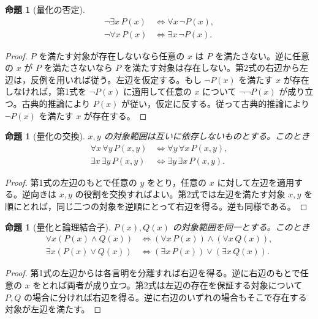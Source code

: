\documentclass[a5paper,10pt,dvipdfmx]{jsarticle}
\theoremstyle{definition}
\theoremstyle{plain}
\newtheorem{prop}[ruledef]{命題}
\newcommand{\iffc}{\Longleftrightarrow}
\begin{document}
\begin{prop}[量化の否定]
\begin{align*}
\neg\exists x\,P(x)&\iffc\forall x\,\neg P(x),\\
\neg\forall x\,P(x)&\iffc\exists x\,\neg P(x).
\end{align*}
\end{prop}
\begin{proof}
$P$ を満たす対象が存在しないなら任意の $x$ は $P$ を満たさない。逆に任意の $x$ が $P$ を満たさないなら $P$ を満たす対象は存在しない。第2式の右辺から左辺は，反例を用いれば従う。左辺を仮定する。もし $\neg P(x)$ を満たす $x$ が存在しなければ，第1式を $\neg P(x)$ に適用して任意の $x$ について $\neg\neg P(x)$ が成り立つ。古典的推論により $P(x)$ が従い，仮定に反する。従って古典的推論により $\neg P(x)$ を満たす $x$ が存在する。
\end{proof}
\begin{prop}[量化の交換]
$x,y$ の対象範囲は互いに依存しないものとする。このとき
\begin{align*}
\forall x\,\forall y\,P(x,y)&\iffc\forall y\,\forall x\,P(x,y),\\
\exists x\,\exists y\,P(x,y)&\iffc\exists y\,\exists x\,P(x,y).
\end{align*}
\end{prop}
\begin{proof}
第1式の左辺のもとで任意の $y$ をとり，任意の $x$ に対して左辺を適用する。逆向きは $x,y$ の役割を交換すればよい。第2式では左辺を満たす対象 $x,y$ を順にとれば，同じ二つの対象を逆順にとって右辺を得る。逆も同様である。
\end{proof}
\begin{prop}[量化と論理結合子]
$P(x),Q(x)$ の対象範囲を同一とする。このとき
\begin{align*}
\forall x(P(x)\land Q(x))&\iffc(\forall x\,P(x))\land(\forall x\,Q(x)),\\
\exists x(P(x)\lor Q(x))&\iffc(\exists x\,P(x))\lor(\exists x\,Q(x)).
\end{align*}
\end{prop}
\begin{proof}
第1式の左辺からは各言明を分離すれば右辺を得る。逆に右辺のもとで任意の $x$ をとれば両者が成り立つ。第2式は左辺の存在を保証する対象について $P,Q$ の場合に分ければ右辺を得る。逆に右辺のいずれの場合もそこで存在する対象が左辺を満たす。
\end{proof}
\end{document}
